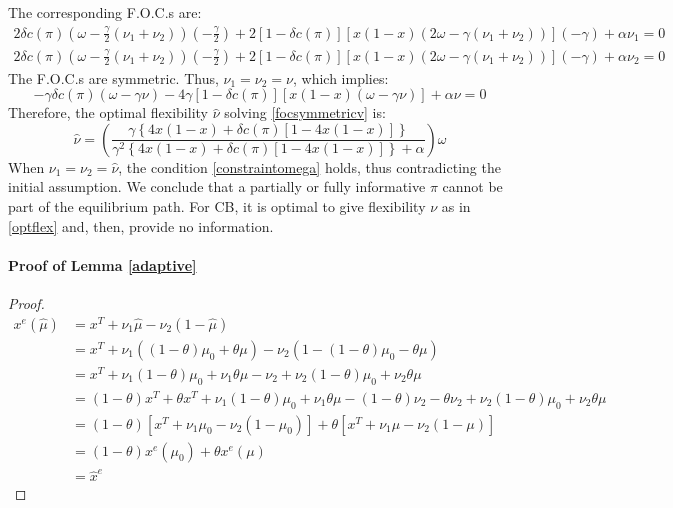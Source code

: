 \documentclass[12pt,a4paper]{article}
\begin{document}
The corresponding F.O.C.s are:
\begin{eqnarray}
2\delta c(\pi)\left(\omega-\frac{\gamma}{2}(\nu_1+\nu_2)\right)\left(-\frac{\gamma}{2}\right)+2[1-\delta c(\pi)]\left[x(1-x)(2\omega-\gamma(\nu_1+\nu_2))\right](-\gamma)+\alpha \nu_1=0\\
2\delta c(\pi)\left(\omega-\frac{\gamma}{2}(\nu_1+\nu_2)\right)\left(-\frac{\gamma}{2}\right)+2[1-\delta c(\pi)]\left[x(1-x)(2\omega-\gamma(\nu_1+\nu_2))\right](-\gamma)+\alpha \nu_2=0
\end{eqnarray}
The F.O.C.s are symmetric. Thus, $\nu_1=\nu_2=\nu$, which implies:
\begin{equation}
\label{focsymmetricv}
    -\gamma\delta c(\pi)\left(\omega-\gamma \nu\right)-4\gamma[1-\delta c(\pi)]\left[x(1-x)(\omega-\gamma \nu)\right]+\alpha \nu=0
\end{equation}
Therefore, the optimal flexibility $\hat{\nu}$ solving \eqref{focsymmetricv} is:
\begin{equation}
    \hat{\nu}=\left(\frac{\gamma \left\{4x(1-x)+\delta c(\pi)[1-4x(1-x)]\right\}}{\gamma^2\left\{4x(1-x)+\delta c(\pi)[1-4x(1-x)] \right\}+\alpha }\right)\omega
\end{equation}
When $\nu_1=\nu_2=\hat{\nu}$, the condition \eqref{constraintomega} holds, thus contradicting the initial assumption. We conclude that a partially or fully informative $\pi$ cannot be part of the equilibrium path. For CB, it is optimal to give flexibility $\nu$ as in \eqref{optflex} and, then, provide no information.

\paragraph{Proof of Lemma \ref{adaptive}}

\begin{proof}
    \begin{align*}
        x^e(\hat{\mu}) &= x^T+\nu_1\hat{\mu}-\nu_2(1-\hat{\mu}) \\
        &= x^T + \nu_1\left((1-\theta)\mu_0 + \theta\mu\right) - \nu_2\left(1-(1-\theta)\mu_0 - \theta\mu\right) \\
        &= x^T + \nu_1(1-\theta)\mu_0 + \nu_1\theta\mu - \nu_2 + \nu_2(1-\theta)\mu_0 + \nu_2\theta\mu \\
        & = (1-\theta)x^T + \theta x^T + \nu_1(1-\theta)\mu_0 + \nu_1\theta\mu - (1-\theta)\nu_2 - \theta\nu_2 + \nu_2(1-\theta)\mu_0 + \nu_2\theta\mu \\
        &= (1-\theta)\left[x^T + \nu_1\mu_0-\nu_2(1-\mu_0)\right] + \theta\left[x^T + \nu_1\mu-\nu_2(1-\mu)\right] \\
        &= (1-\theta)x^e(\mu_0) + \theta x^e(\mu) \\
        &= \hat{x}^e
    \end{align*}
\end{proof}
\end{document}
